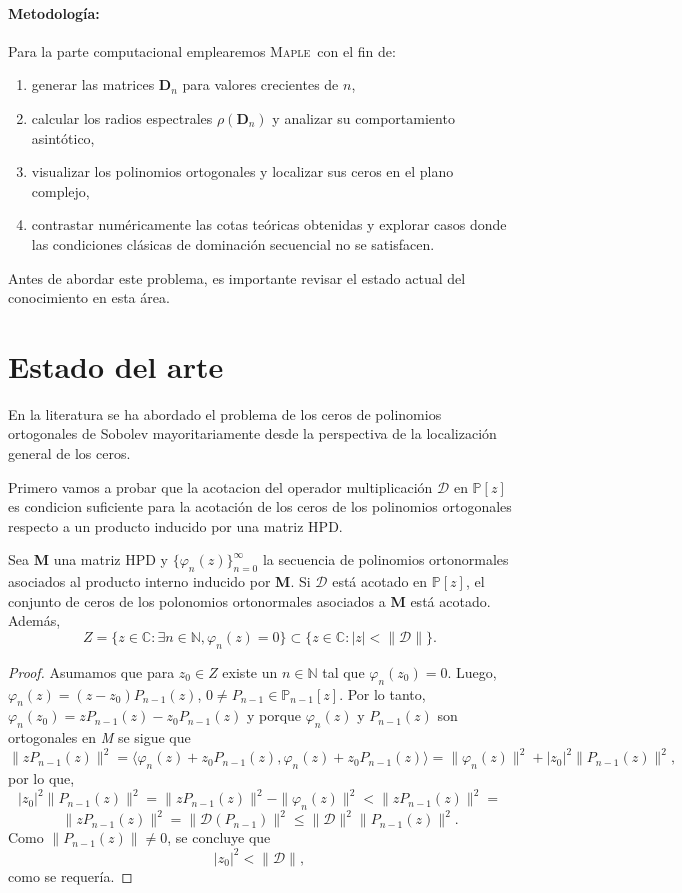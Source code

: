 \paragraph{Metodología: }
Para la parte computacional emplearemos
\textsc{Maple}\, con el fin de:
\begin{enumerate}
  \item generar las matrices \(\mathbf{D}_{n}\) para valores crecientes de \(n\),
  \item calcular los radios espectrales $\rho(\mathbf{D}_{n})$ y analizar su comportamiento asintótico,
  \item visualizar los polinomios ortogonales y localizar sus ceros en el plano complejo,
  \item contrastar numéricamente las cotas teóricas obtenidas y explorar casos donde las condiciones clásicas de dominación secuencial no se satisfacen.
\end{enumerate}

Antes de abordar este problema, es importante revisar el estado actual del conocimiento en esta área.

\section{Estado del arte}

En la literatura se ha abordado el problema de los ceros de polinomios ortogonales de Sobolev mayoritariamente desde la perspectiva de la localización general de los ceros.

Primero vamos a probar que la acotacion del operador multiplicación $\mathcal{D}$ en $\mathbb{P}[z]$ es condicion suficiente para la acotación de los ceros de los polinomios ortogonales respecto a un producto inducido por una matriz HPD.

\begin{proposition}\label{prop:bounded_zeros}
  \cite{escribano2025boundedness} Sea \textbf{M} una matriz HPD y $\{\varphi_n(z)\}_{n=0}^{\infty}$ la secuencia de polinomios ortonormales asociados al producto interno inducido por \textbf{M}. Si $\mathcal{D}$ está acotado en $\mathbb{P}[z]$, el conjunto de ceros de los polonomios ortonormales asociados a \textbf{M} está acotado. Además,
  $$Z=\{z\in\mathbb{C}: \exists n \in \mathbb{N},\varphi_n(z)=0\} \subset \{z\in\mathbb{C}:|z|<\|\mathcal{D}\|\}.$$
\end{proposition}

\begin{proof}
  Asumamos que para $z_0 \in Z$ existe un $n \in \mathbb{N}$ tal que $\varphi_n(z_0)=0$. Luego, $\varphi_n(z)=(z-z_0)P_{n-1}(z)$, $0 \neq P_{n-1} \in \mathbb{P}_{n-1}[z]$. Por lo tanto, $\varphi_n(z_0)=zP_{n-1}(z)-z_0P_{n-1}(z)$ y porque $\varphi_n(z)$ y $P_{n-1}(z)$ son ortogonales en \textit{M} se sigue que
  $$\|zP_{n-1}(z)\|^2=\langle\varphi_n(z)+z_0P_{n-1}(z),\varphi_n(z)+z_0P_{n-1}(z)\rangle = \|\varphi_n(z)\|^2+|z_0|^2\|P_{n-1}(z)\|^2,$$
  por lo que,
  $$|z_0|^2\|P_{n-1}(z)\|^2=\|zP_{n-1}(z)\|^2- \|\varphi_n(z)\|^2<\|zP_{n-1}(z)\|^2=$$
  $$\|zP_{n-1}(z)\|^2=\|\mathcal{D}(P_{n-1})\|^2\leq\|\mathcal{D}\|^2\|P_{n-1}(z)\|^2.$$
  Como $\|P_{n-1}(z)\| \neq 0$, se concluye que
  $$|z_0|^2<\|\mathcal{D}\|,$$
  como se requería.
\end{proof}

